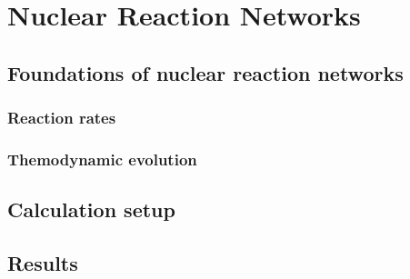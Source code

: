 

\chapter{Nuclear Reaction Networks}

\section{Foundations of nuclear reaction networks}
\subsection{Reaction rates}
\subsection{Themodynamic evolution}
\section{Calculation setup}
\section{Results}








